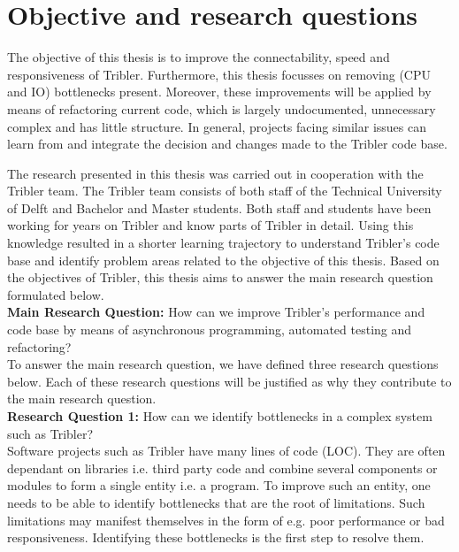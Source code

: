 \section{Objective and research questions}
\label{chp1:sct:objectives-research-questions}
The objective of this thesis is to improve the connectability, speed and responsiveness of Tribler. Furthermore, this thesis focusses on removing (CPU and IO) bottlenecks present.
Moreover, these improvements will be applied by means of refactoring current code, which is largely undocumented, unnecessary complex and has little structure.
In general, projects facing similar issues can learn from and integrate the decision and changes made to the Tribler code base.

The research presented in this thesis was carried out in cooperation with the Tribler team. 
The Tribler team consists of both staff of the Technical University of Delft and Bachelor and Master students.
Both staff and students have been working for years on Tribler and know parts of Tribler in detail.
Using this knowledge resulted in a shorter learning trajectory to understand Tribler's code base and identify problem areas related to the objective of this thesis.
Based on the objectives of Tribler, this thesis aims to answer the main research question formulated below.\\

\textbf{Main Research Question:} How can we improve Tribler's performance and code base by means of asynchronous programming, automated testing and refactoring?\\

To answer the main research question, we have defined three research questions below. Each of these research questions will be justified as why they contribute to the main research question.\\

\textbf{Research Question 1:} How can we identify bottlenecks in a complex system such as Tribler?\\

Software projects such as Tribler have many lines of code (LOC). 
They are often dependant on libraries i.e. third party code and combine several components or modules to form a single entity i.e. a program.
To improve such an entity, one needs to be able to identify bottlenecks that are the root of limitations.
Such limitations may manifest themselves in the form of e.g. poor performance or bad responsiveness.
Identifying these bottlenecks is the first step to resolve them.\\

